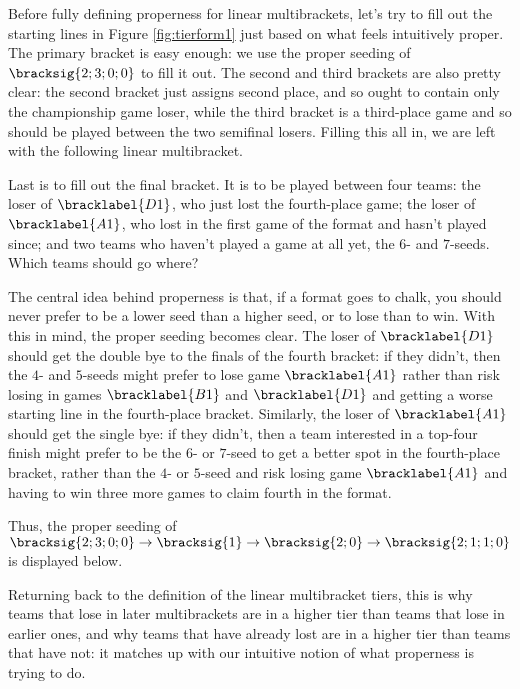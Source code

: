 {Before fully defining properness for linear multibrackets, let's try to fill out the starting lines in Figure \ref{fig:tierform1} just based on what feels intuitively proper. The primary bracket is easy enough: we use the proper seeding of $\bracksig{2;3;0;0}$ to fill it out. The second and third brackets are also pretty clear: the second bracket just assigns second place, and so ought to contain only the championship game loser, while the third bracket is a third-place game and so should be played between the two semifinal losers. Filling this all in, we are left with the following linear multibracket.


Last is to fill out the final bracket. It is to be played between four teams: the loser of $\bracklabel{D1}$, who just lost the fourth-place game; the loser of $\bracklabel{A1}$, who lost in the first game of the format and hasn't played since; and two teams who haven't played a game at all yet, the $6$- and $7$-seeds. Which teams should go where?

The central idea behind properness is that, if a format goes to chalk, you should never prefer to be a lower seed than a higher seed, or to lose than to win. With this in mind, the proper seeding becomes clear. The loser of $\bracklabel{D1}$ should get the double bye to the finals of the fourth bracket: if they didn't, then the $4$- and $5$-seeds might prefer to lose game $\bracklabel{A1}$ rather than risk losing in games $\bracklabel{B1}$ and $\bracklabel{D1}$ and getting a worse starting line in the fourth-place bracket. Similarly, the loser of $\bracklabel{A1}$ should get the single bye: if they didn't, then a team interested in a top-four finish might prefer to be the $6$- or $7$-seed to get a better spot in the fourth-place bracket, rather than the $4$- or $5$-seed and risk losing game $\bracklabel{A1}$ and having to win three more games to claim fourth in the format.

Thus, the proper seeding of $\bracksig{2;3;0;0} \to \bracksig{1} \to \bracksig{2;0} \to \bracksig{2;1;1;0}$ is displayed below.


Returning back to the definition of the linear multibracket tiers, this is why teams that lose in later multibrackets are in a higher tier than teams that lose in earlier ones, and why teams that have already lost are in a higher tier than teams that have not: it matches up with our intuitive notion of what properness is trying to do.

}
